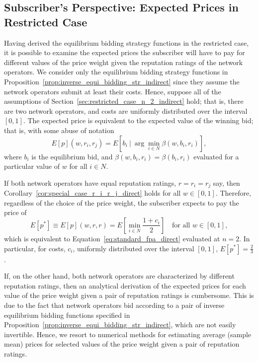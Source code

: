 \subsection{Subscriber's Perspective: Expected Prices in Restricted Case} %
\label{sub:subscriber_s_perspective_expected_prices_in_restricted_case_indirect}
Having derived the equilibrium bidding strategy functions in the restricted case, it is possible to examine the expected prices the subscriber will have to pay for different values of the price weight given the reputation ratings of the network operators. We consider only the equilibrium bidding strategy functions in Proposition~\ref{prop:inverse_equi_bidding_str_indirect} since they assume the network operators submit at least their costs. Hence, suppose all of the assumptions of Section~\ref{sec:restricted_case_n_2_indirect} hold; that is, there are two network operators, and costs are uniformly distributed over the interval $[0,1]$. The expected price is equivalent to the expected value of the winning bid; that is, with some abuse of notation
\begin{equation}
  \label{eq:exp_price_def_indirect}
  E[p](w,r_i,r_j) = E[b_i \:\vert\: \arg\min_{i\in N}\beta(w,b_i,r_i)],
\end{equation}
where $b_i$ is the equilibrium bid, and $\beta(w,b_i,r_i) = \beta(b_i,r_i)$ evaluated for a particular value of $w$ for all $i\in N$.

If both network operators have equal reputation ratings, $r = r_i = r_j$ say, then Corollary~\ref{cor:special_case_r_i_r_j_direct} holds for all $w\in [0,1]$. Therefore, regardless of the choice of the price weight, the subscriber expects to pay the price of
\begin{equation}
  \label{eq:exp_price_at_w_1_indirect}
  E[p^*] \equiv E[p](w,r,r) = E\left[\min_{i\in N}\frac{1+c_i}{2}\right] \quad\text{for all } w\in [0,1],
\end{equation}
which is equivalent to Equation~\eqref{eq:standard_fpa_direct} evaluated at $n=2$. In particular, for costs, $c_i$, uniformly distributed over the interval $[0,1]$, $E[p^*] = \frac{2}{3}$.

If, on the other hand, both network operators are characterized by different reputation ratings, then an analytical derivation of the expected prices for each value of the price weight given a pair of reputation ratings is cumbersome. This is due to the fact that network operators bid according to a pair of inverse equilibrium bidding functions specified in Proposition~\ref{prop:inverse_equi_bidding_str_indirect}, which are not easily invertible. Hence, we resort to numerical methods for estimating average (sample mean) prices for selected values of the price weight given a pair of reputation ratings.

